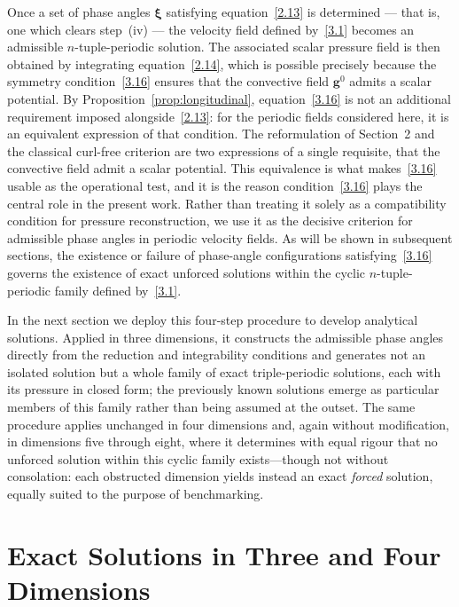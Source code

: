 \documentclass[11pt]{jfm}
\numberwithin{equation}{section}
\begin{document}
Once a set of phase angles \( \boldsymbol{\xi} \) satisfying equation~\eqref{2.13} is determined --- that is, one which clears step~(iv) --- the velocity field defined by~\eqref{3.1} becomes an admissible $n$-tuple-periodic solution. The associated scalar pressure field is then obtained by integrating equation~\eqref{2.14}, which is possible precisely because the symmetry condition~\eqref{3.16} ensures that the convective field $\boldsymbol{g}^0$ admits a scalar potential. By Proposition~\ref{prop:longitudinal}, equation~\eqref{3.16} is not an additional requirement imposed alongside~\eqref{2.13}: for the periodic fields considered here, it is an equivalent expression of that condition.
The reformulation of Section~2 and the classical curl-free criterion are two expressions of a
single requisite, that the convective field admit a scalar potential. This equivalence is what
makes~\eqref{3.16} usable as the operational test, and it is the reason
condition~\eqref{3.16} plays the central role in the present work. Rather than treating it
solely as a compatibility condition for pressure reconstruction, we use it as the decisive
criterion for admissible phase angles in periodic velocity fields. As will be shown
in subsequent sections, the existence or failure of phase-angle configurations
satisfying~\eqref{3.16} governs the existence of exact unforced solutions within the cyclic
$n$-tuple-periodic family defined by~\eqref{3.1}.

In the next section we deploy this four-step procedure to develop analytical solutions. Applied in three dimensions, it constructs the admissible phase angles directly from the reduction and integrability conditions and generates not an isolated solution but a whole family of exact triple-periodic solutions, each with its pressure in closed form; the previously known solutions emerge as particular members of this family rather than being assumed at the outset. The same procedure applies unchanged in four dimensions and, again without modification, in
dimensions five through eight, where it determines with equal rigour that no unforced solution within this
cyclic family exists---though not without consolation: each obstructed dimension yields instead an exact
\emph{forced} solution, equally suited to the purpose of benchmarking.

\section{Exact Solutions in Three and Four Dimensions}
\label{sec:solutions-3D-4D}
\end{document}
